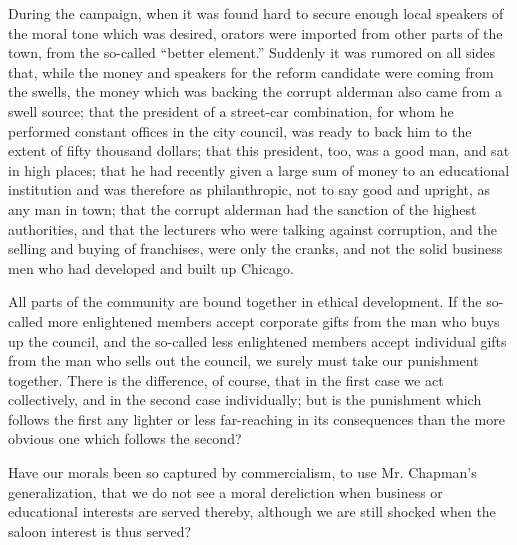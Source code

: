 \documentclass[]{article}
\begin{document}
\begin{sectionbody}
\addamsparagraph During the campaign, when it was found hard to secure enough local
speakers of the moral tone which was desired, orators were imported from
other parts of the town, from the so-called ``better element.'' Suddenly
it was rumored on all sides that, while the money and speakers for the
reform candidate were coming from the swells, the money which was
backing the corrupt alderman also came from a swell source; that the
president of a street-car combination, for whom he performed constant
offices in the city council, was ready to back him to the extent of
fifty thousand dollars; that this president, too, was a good man, and
sat in high places; that he had recently given a large sum of money to
an educational institution and was therefore as philanthropic, not to
say good and upright, as any man in town; that the corrupt alderman had
the sanction of the highest authorities, and that the lecturers who were
talking against corruption, and the selling and buying of franchises,
were only the cranks, and not the solid business men who had developed
and built up Chicago.

\addamsparagraph All parts of the community are bound together in ethical development. If
the so-called more enlightened members accept corporate gifts from the
man who buys up the council, and the so-called less enlightened members
accept individual gifts from the man who sells out the council, we
surely must take our punishment together. There is the difference, of
course, that in the first case we act collectively, and in the second
case individually; but is the punishment which follows the first any
lighter or less far-reaching in its consequences than the more obvious
one which follows the second?

\addamsparagraph Have our morals been so captured by commercialism, to use Mr. Chapman's
generalization, that we do not see a moral dereliction when business or
educational interests are served thereby, although we are still shocked
when the saloon interest is thus served?


\end{sectionbody}
\end{document}
